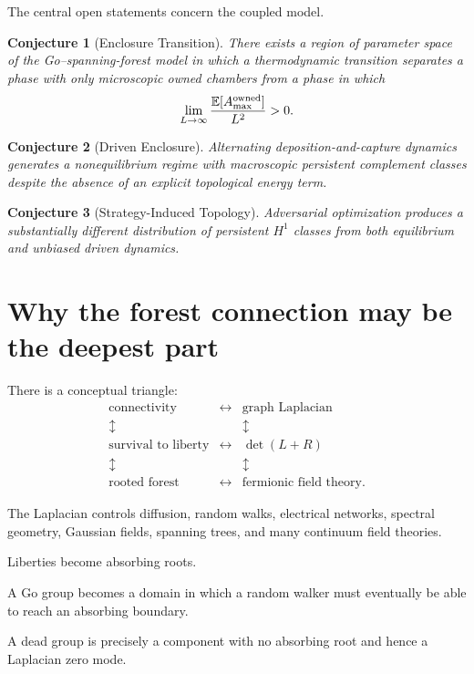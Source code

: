 \documentclass[11pt]{article}
\newtheorem{conjecture}{Conjecture}
\begin{document}
The central open statements concern the coupled model.

\begin{conjecture}[Enclosure Transition]
There exists a region of parameter space of the Go--spanning-forest model in which a thermodynamic transition separates a phase with only microscopic owned chambers from a phase in which
\[
\lim_{L\to\infty}
\frac{\mathbb E[A_{\max}^{\rm owned}]}{L^2}>0.
\]
\end{conjecture}

\begin{conjecture}[Driven Enclosure]
Alternating deposition-and-capture dynamics generates a nonequilibrium regime with macroscopic persistent complement classes despite the absence of an explicit topological energy term.
\end{conjecture}

\begin{conjecture}[Strategy-Induced Topology]
Adversarial optimization produces a substantially different distribution of persistent \(H^1\) classes from both equilibrium and unbiased driven dynamics.
\end{conjecture}

\section{Why the forest connection may be the deepest part}

There is a conceptual triangle:
\[
\boxed{
\begin{array}{ccc}
\text{connectivity} &\longleftrightarrow& \text{graph Laplacian}\\
\updownarrow && \updownarrow\\
\text{survival to liberty} &\longleftrightarrow& \det(L+R)\\
\updownarrow && \updownarrow\\
\text{rooted forest} &\longleftrightarrow& \text{fermionic field theory}.
\end{array}
}
\]

The Laplacian controls diffusion, random walks, electrical networks, spectral geometry, Gaussian fields, spanning trees, and many continuum field theories.

Liberties become absorbing roots.

A Go group becomes a domain in which a random walker must eventually be able to reach an absorbing boundary.

A dead group is precisely a component with no absorbing root and hence a Laplacian zero mode.
\end{document}
